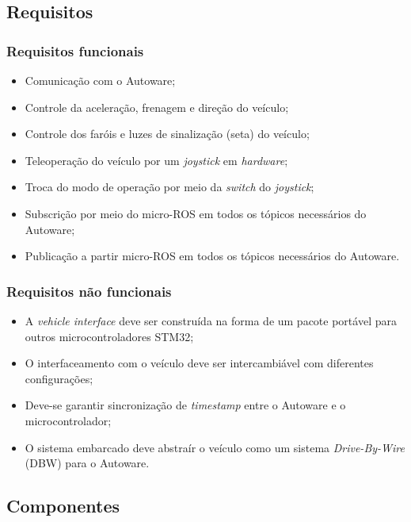 \subsection{Requisitos}

\subsubsection*{Requisitos funcionais}
	
	\begin{itemize}
		\item Comunicação com o Autoware;
		\item Controle da aceleração, frenagem e direção do veículo;
		\item Controle dos faróis e luzes de sinalização (seta) do veículo;
		\item Teleoperação do veículo por um \textit{joystick} em  \textit{hardware};
		\item Troca do modo de operação por meio da \textit{switch} do \textit{joystick};
		\item Subscrição por meio do micro-ROS em todos os tópicos necessários do Autoware;
		\item Publicação a partir micro-ROS em todos os tópicos necessários do Autoware.
		
	\end{itemize}

\subsubsection*{Requisitos não funcionais}
	
	\begin{itemize}
		\item A \textit{vehicle interface} deve ser construída na forma de um pacote portável para outros microcontroladores STM32;
		\item O interfaceamento com o veículo deve ser intercambiável com diferentes configurações;
		\item Deve-se garantir sincronização de \textit{timestamp} entre o Autoware e o microcontrolador;
		\item O sistema embarcado deve abstraír o veículo como um sistema \textit{Drive-By-Wire} (DBW) para o Autoware.
	\end{itemize}
	
\subsection{Componentes}

